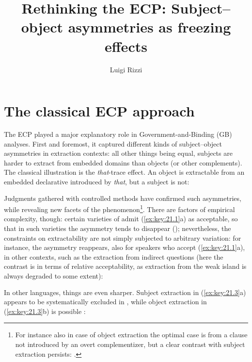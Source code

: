 \documentclass[output=paper]{langsci/langscibook}
\author{Luigi Rizzi}
\title{Rethinking the ECP: Subject--object asymmetries as freezing effects}
\begin{document}
\glsresetall
\maketitle

\section{The classical ECP approach}

The \gls{ECP} played a major explanatory role in
Govern\-ment-and-Binding (\gls{GB}) analyses.  First and foremost,
it captured different kinds of subject--object asymmetries in extraction
contexts: all other things being equal, subjects are harder to extract from
embedded domains than objects (or other complements).  The classical
illustration is the \emph{that}-trace effect. An object is extractable from an
embedded declarative introduced by \emph{that}, but a subject is not:

\ea%
    \label{ex:key:21.1}
    \z
\z
%
Judgments gathered with controlled methods have confirmed such asymmetries,
while revealing new facets of the phenomenon\footnote{For instance also in case
    of object extraction the optimal case is from a clause not introduced by an
    overt complementizer, but a clear contrast with subject extraction
    persists: \citet{Schippers2012}.}. There are factors of empirical
    complexity, though: certain varieties of  admit (\ref{ex:key:21.1}a) as
    acceptable, so that in such varieties the asymmetry tends to disappear
    (\citealt{Sobin2002,Schippers2012}); nevertheless, the constraints on
    extractability are not simply subjected to arbitrary variation: for
    instance, the asymmetry reappears, also for speakers who accept
    (\ref{ex:key:21.1}a), in other contexts, such as the extraction from indirect
    questions (here the contrast is in terms of relative acceptability, as
    extraction from the weak island is always degraded to some extent):

\ea%
    \label{ex:key:21.2}
    \z
\z
%
In other languages, things are even sharper. Subject extraction in
(\ref{ex:key:21.3}a) appears to be systematically excluded in ,
while object extraction in (\ref{ex:key:21.3}b) is possible
\citep{Berthelot2017}:
\end{document}
